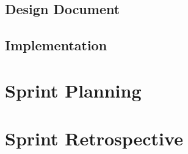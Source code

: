 \documentclass[12pt,onecolumn]{article}
\begin{document}
	\subsection{Design Document} %

	\subsection{Implementation} %

\section{Sprint Planning} %

\section{Sprint Retrospective} %
\end{document}
